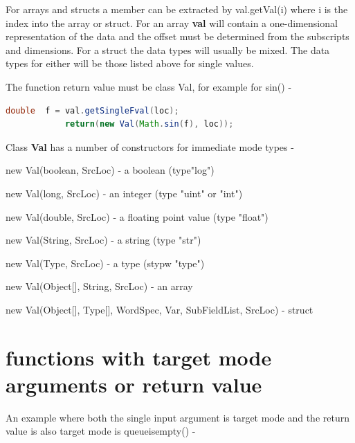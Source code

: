         For arrays and structs a member can be extracted by
        val.getVal(i) where i is the index into the array or struct.
        For an array {\bf val} will contain a one-dimensional representation
        of the data and the offset must be determined from the subscripts
        and dimensions. For a struct the data types will usually be mixed.
        The data types for either will be those listed above for single
        values.
        
        The function return value must be class Val, for example for
        sin() -
        \begin{lstlisting}[gobble=8, language=java]
            double  f = val.getSingleFval(loc);
            return(new Val(Math.sin(f), loc));
        \end{lstlisting}
        
        Class {\bf Val} has a number of constructors for immediate mode types -
        
        \blist
        \item new Val(boolean, SrcLoc) - a boolean (type"log")
        \item new Val(long, SrcLoc) - an integer (type "uint" or "int")
        \item new Val(double, SrcLoc) - a floating point value (type "float")
        \item new Val(String, SrcLoc) - a string (type "str")
        \item new Val(Type, SrcLoc) - a type (stypw "type")
        \item new Val(Object[], String, SrcLoc) - an array
        \item new Val(Object[], Type[], WordSpec, Var, SubFieldList, SrcLoc) -
                struct
        \blend

    \section{functions with target mode arguments or return value}
    
        An example where both the single input argument is target mode and
        the return value is also target mode is queueisempty() -
    

